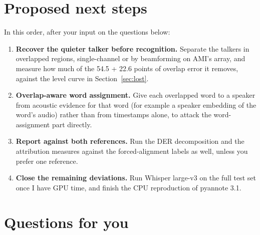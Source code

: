\documentclass[11pt,a4paper]{article}
\begin{document}
\section{Proposed next steps}

In this order, after your input on the questions below:

\begin{enumerate}[leftmargin=*, label=\arabic*.]
  \item \textbf{Recover the quieter talker before recognition.} Separate the talkers in overlapped regions, single-channel or by beamforming on AMI's array, and measure how much of the 54.5 + 22.6 points of overlap error it removes, against the level curve in Section~\ref{sec:lost}.
  \item \textbf{Overlap-aware word assignment.} Give each overlapped word to a speaker from acoustic evidence for that word (for example a speaker embedding of the word's audio) rather than from timestamps alone, to attack the word-assignment part directly.
  \item \textbf{Report against both references.} Run the DER decomposition and the attribution measures against the forced-alignment labels as well, unless you prefer one reference.
  \item \textbf{Close the remaining deviations.} Run Whisper large-v3 on the full test set once I have GPU time, and finish the CPU reproduction of pyannote 3.1.
\end{enumerate}

\section{Questions for you}
\end{document}
